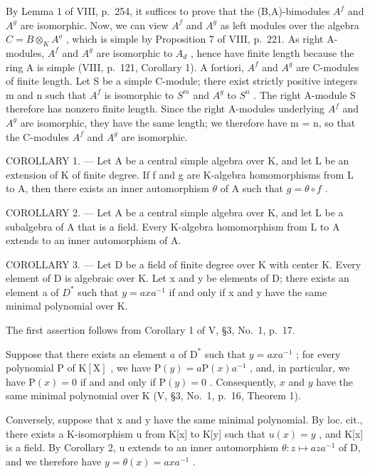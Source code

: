 By Lemma 1 of VIII, p.~254, it suffices to prove that the (B,A)-bimodules \(A^{f}\) and \(A^{g}\) are isomorphic. Now, we can view \(A^{f}\) and \(A^{g}\) as left modules over the algebra \(C = B \otimes_{K} A^{o}\) , which is simple by Proposition 7 of VIII, p.~221. As right A-modules, \(A^{f}\) and \(A^{g}\) are isomorphic to \(A_{d}\) , hence have finite length because the ring A is simple (VIII, p.~121, Corollary 1). A fortiori, \(A^{f}\) and \(A^{g}\) are C-modules of finite length. Let S be a simple C-module; there exist strictly positive integers m and n such that \(A^{f}\) is isomorphic to \(S^{m}\) and \(A^{g}\) to \(S^{n}\) . The right A-module S therefore has nonzero finite length. Since the right A-modules underlying \(A^{f}\) and \(A^{g}\) are isomorphic, they have the same length; we therefore have m = n, so that the C-modules \(A^{f}\) and \(A^{g}\) are isomorphic.

COROLLARY 1. --- Let A be a central simple algebra over K, and let L be an extension of K of finite degree. If f and g are K-algebra homomorphisms from L to A, then there exists an inner automorphism \(\theta\) of A such that \(g = \theta \circ f\) .

COROLLARY 2. --- Let A be a central simple algebra over K, and let L be a subalgebra of A that is a field. Every K-algebra homomorphism from L to A extends to an inner automorphism of A.

COROLLARY 3. --- Let D be a field of finite degree over K with center K. Every element of D is algebraic over K. Let x and y be elements of D; there exists an element a of \(D^{*}\) such that \(y = axa^{-1}\) if and only if x and y have the same minimal polynomial over K.

The first assertion follows from Corollary 1 of V, §3, No.~1, p.~17.

Suppose that there exists an element \(a\) of \(\mathrm{D}^*\) such that \(y = axa^{-1}\) ; for every polynomial \(\mathrm{P}\) of \(\mathrm{K}[\mathrm{X}]\) , we have \(\mathrm{P}(y) = a\mathrm{P}(x)a^{-1}\) , and, in particular, we have \(\mathrm{P}(x) = 0\) if and and only if \(\mathrm{P}(y) = 0\) . Consequently, \(x\) and \(y\) have the same minimal polynomial over \(\mathrm{K}\) (V, §3, No.~1, p.~16, Theorem 1).

Conversely, suppose that x and y have the same minimal polynomial. By loc. cit., there exists a K-isomorphism u from K{[}x{]} to K{[}y{]} such that \(u(x) = y\) , and K{[}x{]} is a field. By Corollary 2, u extends to an inner automorphism \(\theta : z \mapsto aza^{-1}\) of D, and we therefore have \(y = \theta(x) = axa^{-1}\) .

